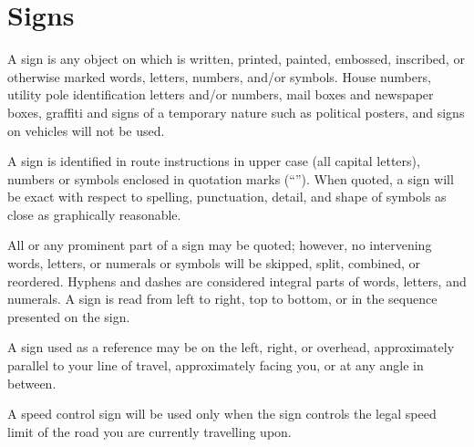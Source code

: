 \section{Signs}

\hiddensubsection{}
A sign is any object on which is written, printed, painted, embossed, inscribed, or otherwise marked words, letters, numbers, and/or symbols.  House numbers, utility pole identification letters and/or numbers, mail boxes and newspaper boxes, graffiti and signs of a temporary nature such as political posters, and signs on vehicles will not be used.

\hiddensubsection{}
A sign is identified in route instructions in upper case (all capital letters), numbers or symbols enclosed in quotation marks (``'').  When quoted, a sign will be exact with respect to spelling, punctuation, detail, and shape of symbols as close as graphically reasonable.

\hiddensubsection{}
All or any prominent part of a sign may be quoted; however, no intervening words, letters, or numerals or symbols will be skipped, split, combined, or reordered.  Hyphens and dashes are considered integral parts of words, letters, and numerals.  A sign is read from left to right, top to bottom, or in the sequence presented on the sign.

\hiddensubsection{}
A sign used as a reference may be on the left, right, or overhead, approximately parallel to your line of travel, approximately facing you, or at any angle in between.

\hiddensubsection{}
A speed control sign will be used only when the sign controls the legal speed limit of the road you are currently travelling upon.
